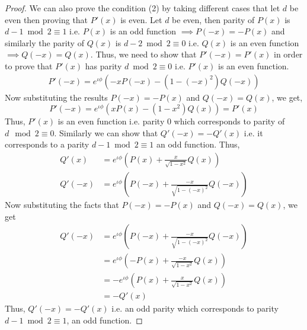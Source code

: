 \documentclass[12pt, oneside]{book}
\theoremstyle{definition}
\theoremstyle{definition}
\theoremstyle{remark}
\begin{document}
\begin{proof}
    We can also prove the condition (2) by taking different cases that let $d$ be even then proving that $P'(x)$ is even. Let $d$ be even, then parity of $P(x)$ is $d-1 \bmod 2 \equiv 1$ i.e. $P(x)$ is an odd function $\implies P(-x)=-P(x)$ and similarly the parity of $Q(x)$ is $d-2\bmod 2 \equiv 0$ i.e. $Q(x)$ is an even function $\implies Q(-x)=Q(x)$. Thus, we need to show that $P'(-x)=P'(x)$ in order to prove that $P'(x)$ has parity $d \bmod 2\equiv 0$ i.e. $P'(x)$ is an even function.
    \begin{align*}
        P'(-x) = e^{\iota \phi}(-xP(-x)-(1-(-x)^2)Q(-x))
    \end{align*}
    Now substituting the results $P(-x)=-P(x)$ and $Q(-x)=Q(x)$, we get,
    \[
    P'(-x) = e^{\iota \phi}(xP(x)-(1-x^2)Q(x))=P'(x)
    \]
    Thus, $P'(x)$ is an even function i.e. parity $0$ which corresponds to parity of $d\mod 2\equiv 0$. Similarly we can show that $Q'(-x)=-Q'(x)$ i.e. it corresponds to a parity $d-1\bmod 2\equiv 1$ an odd function. Thus,
    \begin{align*}
    Q'(x)&=e^{\iota \phi}\left(P(x)+\frac{x}{\sqrt{1-x^2}}Q(x)\right)\\
    Q'(-x)&=e^{\iota \phi}\left(P(-x)+\frac{-x}{\sqrt{1-(-x)^2}}Q(-x)\right)
    \end{align*}
    Now substituting the facts that $P(-x)=-P(x)$ and $Q(-x)=Q(x)$, we get
    \begin{align*}
        Q'(-x) &= e^{\iota \phi}\left(P(-x)+\frac{-x}{\sqrt{1-(-x)^2}}Q(-x)\right)\\
        &=e^{\iota \phi}\left(-P(x)+\frac{-x}{\sqrt{1-x^2}}Q(x)\right)\\
        &=-e^{\iota \phi}\left(P(x)+\frac{x}{\sqrt{1-x^2}}Q(x)\right)\\
        &=-Q'(x)
    \end{align*}
    Thus, $Q'(-x)=-Q'(x)$ i.e. an odd parity which corresponds to parity $d-1\bmod 2\equiv 1$, an odd function. 
    

\end{proof}
\end{document}
